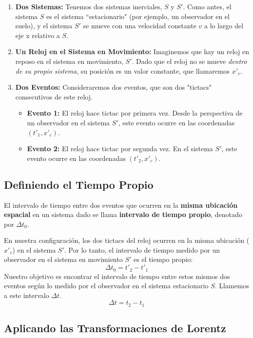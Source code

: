 \documentclass[11pt,a4paper]{article}
\begin{document}
\begin{enumerate}
    \item \textbf{Dos Sistemas:} Tenemos dos sistemas inerciales, $S$ y $S'$. Como antes, el sistema $S$ es el sistema ``estacionario" (por ejemplo, un observador en el suelo), y el sistema $S'$ se mueve con una velocidad constante $v$ a lo largo del eje x relativo a $S$.

    \item \textbf{Un Reloj en el Sistema en Movimiento:} Imaginemos que hay un reloj en reposo en el sistema en movimiento, $S'$. Dado que el reloj no se mueve \textit{dentro de su propio sistema}, su posición es un valor constante, que llamaremos $x'_c$.

    \item \textbf{Dos Eventos:} Consideraremos dos eventos, que son dos "tictacs" consecutivos de este reloj.
    \begin{itemize}
        \item \textbf{Evento 1:} El reloj hace tictac por primera vez. Desde la perspectiva de un observador en el sistema $S'$, este evento ocurre en las coordenadas $(t'_1, x'_c)$.
        \item \textbf{Evento 2:} El reloj hace tictac por segunda vez. En el sistema $S'$, este evento ocurre en las coordenadas $(t'_2, x'_c)$.
    \end{itemize}
\end{enumerate}

\subsection{Definiendo el Tiempo Propio}

El intervalo de tiempo entre dos eventos que ocurren en la \textbf{misma ubicación espacial} en un sistema dado se llama \textbf{intervalo de tiempo propio}, denotado por $\Delta t_0$.

En nuestra configuración, los dos tictacs del reloj ocurren en la misma ubicación ($x'_c$) en el sistema $S'$. Por lo tanto, el intervalo de tiempo medido por un observador en el sistema en movimiento $S'$ es el tiempo propio:
\[ \Delta t_0 = t'_2 - t'_1 \]
Nuestro objetivo es encontrar el intervalo de tiempo entre estos mismos dos eventos según lo medido por el observador en el sistema estacionario $S$. Llamemos a este intervalo $\Delta t$.
\[ \Delta t = t_2 - t_1 \]

\subsection{Aplicando las Transformaciones de Lorentz}
\end{document}

